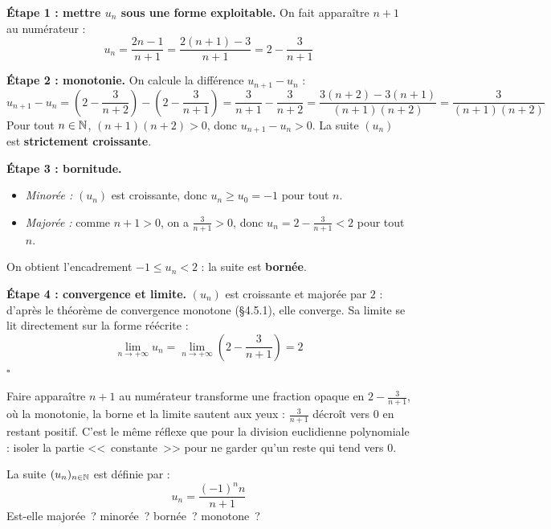 \begin{proofbox}[Solution]
\textbf{Étape 1 : mettre $u_n$ sous une forme exploitable.} On fait apparaître $n+1$ au numérateur :
\[
  u_n = \frac{2n-1}{n+1} = \frac{2(n+1) - 3}{n+1} = 2 - \frac{3}{n+1}
\]

\textbf{Étape 2 : monotonie.} On calcule la différence $u_{n+1} - u_n$ :
\[
  u_{n+1} - u_n = \left(2 - \frac{3}{n+2}\right) - \left(2 - \frac{3}{n+1}\right) = \frac{3}{n+1} - \frac{3}{n+2} = \frac{3(n+2) - 3(n+1)}{(n+1)(n+2)} = \frac{3}{(n+1)(n+2)}
\]
Pour tout $n \in \mathbb{N}$, $(n+1)(n+2) > 0$, donc $u_{n+1} - u_n > 0$. La suite $(u_n)$ est \textbf{strictement croissante}.

\textbf{Étape 3 : bornitude.}
\begin{itemize}[leftmargin=1cm]
  \item \textit{Minorée :} $(u_n)$ est croissante, donc $u_n \geqslant u_0 = -1$ pour tout $n$.
  \item \textit{Majorée :} comme $n + 1 > 0$, on a $\frac{3}{n+1} > 0$, donc $u_n = 2 - \frac{3}{n+1} < 2$ pour tout $n$.
\end{itemize}
On obtient l'encadrement $-1 \leqslant u_n < 2$ : la suite est \textbf{bornée}.

\textbf{Étape 4 : convergence et limite.} $(u_n)$ est croissante et majorée par $2$ : d'après le théorème de convergence monotone (\S 4.5.1), elle converge. Sa limite se lit directement sur la forme réécrite :
\[
  \lim_{n \to +\infty} u_n = \lim_{n \to +\infty}\left(2 - \frac{3}{n+1}\right) = 2
\]
\hfill$\square$
\end{proofbox}

\begin{intuitionbox}
Faire apparaître $n+1$ au numérateur transforme une fraction opaque en $2 - \frac{3}{n+1}$, où la monotonie, la borne et la limite sautent aux yeux : $\frac{3}{n+1}$ décroît vers $0$ en restant positif. C'est le même réflexe que pour la division euclidienne polynomiale : isoler la partie <<~constante~>> pour ne garder qu'un reste qui tend vers $0$.
\end{intuitionbox}


\begin{exbox}
La suite $(u_n)_{n \in \mathbb{N}}$ est définie par :
\[
  u_n = \frac{(-1)^n n}{n+1}
\]
Est-elle majorée~? minorée~? bornée~? monotone~?
\end{exbox}

